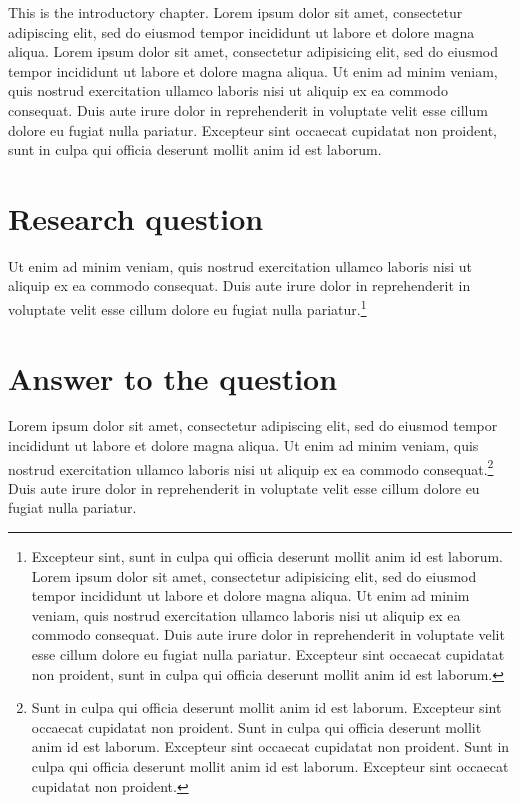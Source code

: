 This is the introductory chapter. Lorem ipsum dolor sit amet, consectetur adipiscing elit, sed do eiusmod tempor incididunt ut labore et dolore magna aliqua. Lorem ipsum dolor sit amet, consectetur adipisicing elit, sed do eiusmod tempor incididunt ut labore et dolore magna aliqua. Ut enim ad minim veniam, quis nostrud exercitation ullamco laboris nisi ut aliquip ex ea commodo consequat. Duis aute irure dolor in reprehenderit in voluptate velit esse cillum dolore eu fugiat nulla pariatur. Excepteur sint occaecat cupidatat non proident, sunt in culpa qui officia deserunt mollit anim id est laborum.

\section{Research question}\label{s:introduction} 

Ut enim ad minim veniam, quis nostrud exercitation ullamco laboris nisi ut aliquip ex ea commodo consequat. Duis aute irure dolor in reprehenderit in voluptate velit esse cillum dolore eu fugiat nulla pariatur.\footnote{Excepteur sint, sunt in culpa qui officia deserunt mollit anim id est laborum. Lorem ipsum dolor sit amet, consectetur adipisicing elit, sed do eiusmod tempor incididunt ut labore et dolore magna aliqua. Ut enim ad minim veniam, quis nostrud exercitation ullamco laboris nisi ut aliquip ex ea commodo
consequat. Duis aute irure dolor in reprehenderit in voluptate velit esse
cillum dolore eu fugiat nulla pariatur. Excepteur sint occaecat cupidatat non
proident, sunt in culpa qui officia deserunt mollit anim id est laborum.}

\section{Answer to the question} 

Lorem ipsum dolor sit amet, consectetur adipiscing elit, sed do eiusmod tempor incididunt ut labore et dolore magna aliqua. Ut enim ad minim veniam, quis nostrud exercitation ullamco laboris nisi ut aliquip ex ea commodo consequat.\footnote{Sunt in culpa qui officia deserunt mollit anim id est laborum. Excepteur sint occaecat cupidatat non proident. Sunt in culpa qui officia deserunt mollit anim id est laborum. Excepteur sint occaecat cupidatat non proident. Sunt in culpa qui officia deserunt mollit anim id est laborum. Excepteur sint occaecat cupidatat non proident.} Duis aute irure dolor in reprehenderit in voluptate velit esse cillum dolore eu fugiat nulla pariatur. 

